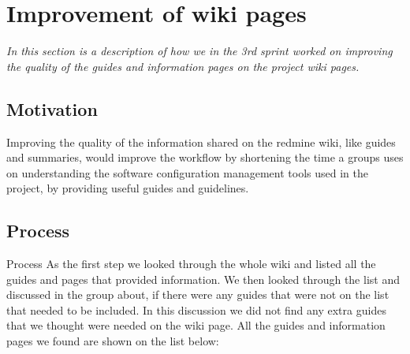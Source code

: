 \section{Improvement of wiki pages}
\textit{In this section is a description of how we in the 3rd sprint worked on improving the quality of the guides and information pages on the project wiki pages.}

\subsection{Motivation}
Improving the quality of the information shared on the redmine wiki, like guides and summaries, would improve the workflow by shortening the time a groups uses on understanding the software configuration management tools used in the project, by providing useful guides and guidelines.


\subsection{Process}
Process
As the first step we looked through the whole wiki and listed all the guides and pages that provided information. We then looked through the list and discussed in the group about, if there were any guides that were not on the list that needed to be included. In this discussion we did not find any extra guides that we thought were needed on the wiki page. All the guides and information pages we found are shown on the list below:

